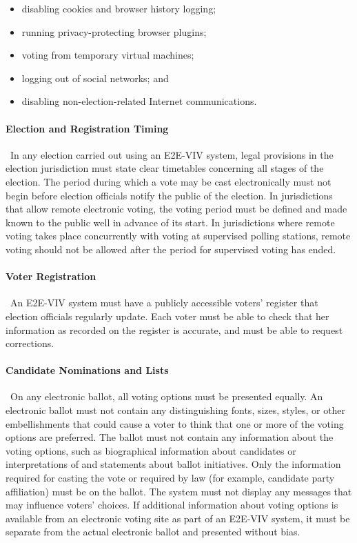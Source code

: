\begin{itemize}
\item disabling cookies and browser history logging;
\item running privacy-protecting browser plugins;
\item  voting from temporary virtual machines;
\item  logging out of social networks; and
\item disabling non-election-related Internet communications.
\end{itemize}

\paragraph{Election and Registration Timing} \ In any election carried
out using an E2E-VIV system, legal provisions in the election
jurisdiction must state clear timetables concerning all stages of the
election. The period during which a vote may be cast electronically
must not begin before election officials notify the public of the
election. In jurisdictions that allow remote electronic voting, the
voting period must be defined and made known to the public well in
advance of its start. In jurisdictions where remote voting takes place
concurrently with voting at supervised polling stations, remote voting
should not be allowed after the period for supervised voting has
ended.

\paragraph{Voter Registration} \ An E2E-VIV system must have a
publicly accessible voters' register that election officials regularly
update. Each voter must be able to check that her information as
recorded on the register is accurate, and must be able to request
corrections.

\paragraph{Candidate Nominations and Lists} \ On any electronic
ballot, all voting options must be presented equally. An electronic
ballot must not contain any distinguishing fonts, sizes, styles, or
other embellishments that could cause a voter to think that one or
more of the voting options are preferred. The ballot must not contain
any information about the voting options, such as biographical
information about candidates or interpretations of and statements
about ballot initiatives. Only the information required for casting
the vote or required by law (for example, candidate party affiliation)
must be on the ballot. The system must not display any messages that
may influence voters' choices. If additional information about voting
options is available from an electronic voting site as part of an
E2E-VIV system, it must be separate from the actual electronic ballot
and presented without bias.

